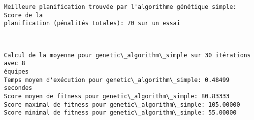 \documentclass[11pt]{article}
\begin{document}
    \begin{Verbatim}[commandchars=\\\{\}]
Meilleure planification trouvée par l'algorithme génétique simple: Score de la
planification (pénalités totales): 70 sur un essai
    \end{Verbatim}

    \begin{center}
    \end{center}
    { \hspace*{\fill} \\}
    
    \begin{Verbatim}[commandchars=\\\{\}]
Calcul de la moyenne pour genetic\_algorithm\_simple sur 30 itérations avec 8
équipes
Temps moyen d'exécution pour genetic\_algorithm\_simple: 0.48499 secondes
Score moyen de fitness pour genetic\_algorithm\_simple: 80.83333
Score maximal de fitness pour genetic\_algorithm\_simple: 105.00000
Score minimal de fitness pour genetic\_algorithm\_simple: 55.00000


    \end{Verbatim}

    \begin{center}
    \end{center}
    { \hspace*{\fill} \\}
    
\end{document}
